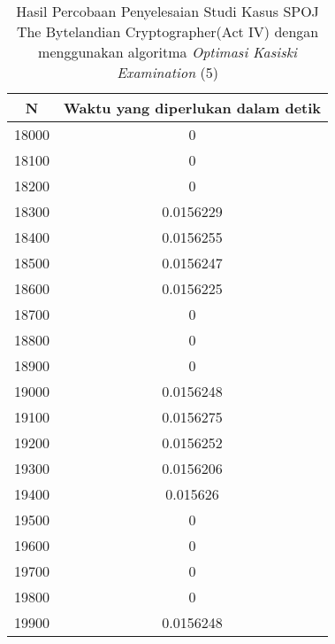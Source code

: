 \begin{table}[H]
\centering
\begin{tabular}{|c|c|}\hline
N&Waktu yang diperlukan dalam detik\\ \hline
18000&0\\ \hline
18100&0\\ \hline
18200&0\\ \hline
18300&0.0156229\\ \hline
18400&0.0156255\\ \hline
18500&0.0156247\\ \hline
18600&0.0156225\\ \hline
18700&0\\ \hline
18800&0\\ \hline
18900&0\\ \hline
19000&0.0156248\\ \hline
19100&0.0156275\\ \hline
19200&0.0156252\\ \hline
19300&0.0156206\\ \hline
19400&0.015626\\ \hline
19500&0\\ \hline
19600&0\\ \hline
19700&0\\ \hline
19800&0\\ \hline
19900&0.0156248\\ \hline
\end{tabular}
\caption {Hasil Percobaan Penyelesaian Studi Kasus SPOJ The Bytelandian Cryptographer(Act IV) dengan menggunakan algoritma \textit{Optimasi Kasiski Examination} (5)}
\label{tab:res10}
\end{table}
